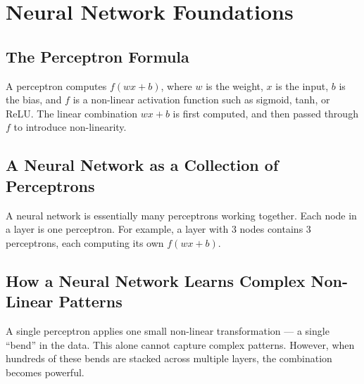 

\section{Neural Network Foundations}

\subsection{The Perceptron Formula}

A perceptron computes $f(wx + b)$, where $w$ is the weight, $x$ is the input, $b$ is the
bias, and $f$ is a non-linear activation function such as sigmoid, tanh, or ReLU. The
linear combination $wx + b$ is first computed, and then passed through $f$ to introduce
non-linearity.

\subsection{A Neural Network as a Collection of Perceptrons}

A neural network is essentially many perceptrons working together. Each node in a layer
is one perceptron. For example, a layer with 3 nodes contains 3 perceptrons, each
computing its own $f(wx + b)$.

\subsection{How a Neural Network Learns Complex Non-Linear Patterns}

A single perceptron applies one small non-linear transformation --- a single ``bend'' in
the data. This alone cannot capture complex patterns. However, when hundreds of these
bends are stacked across multiple layers, the combination becomes powerful.

